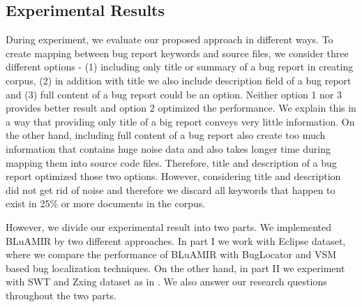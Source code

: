 \documentclass[conference]{IEEEtran}
\begin{document}
\subsection{Experimental Results}
During experiment, we evaluate our proposed approach in different ways. To create mapping between bug report keywords and source files, we consider three different options - (1) including only title or summary of a bug report in creating corpus, (2) in addition with title we also include description field of a bug report and (3) full content of a bug report could be an option. Neither option 1 nor 3 provides better result and option 2 optimized the performance. We explain this in a way that providing only title of a big report conveys very little information. On the other hand, including full content of a bug report also create too much information that contains huge noise data and also takes longer time during mapping them into source code files. Therefore, title and description of a bug report optimized those two options. However, considering title and description did not get rid of noise and therefore we discard all keywords that happen to exist in 25\% or more documents in the corpus.

However, we divide our experimental result into two parts. We implemented BLuAMIR by two different approaches. In   part I we work with Eclipse dataset, where we compare the performance of BLuAMIR with BugLocator \cite{Jian} and VSM based bug localization techniques. On the other hand, in part II we experiment with SWT and Zxing dataset as in \cite{Jian}. We also answer our research questions throughout the two parts.
\end{document}

